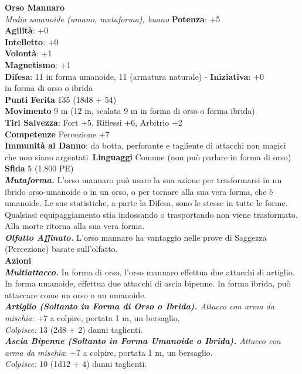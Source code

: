 \begin{multicols}{2}
\medskip\textbf{Orso Mannaro}\\
\emph{Media umanoide (umano, mutaforma), buono}
\textbf{Potenza}: +5\\
\textbf{Agilità}: +0\\
\textbf{Intelletto}: +0\\
\textbf{Volontà}: +1\\
\textbf{Magnetismo}: +1\\
\textbf{Difesa}: 11 in forma umanoide, 11 (armatura naturale) - \textbf{Iniziativa}: +0\\
in forma di orso o ibrida\\
\textbf{Punti Ferita} 135 (18d8 + 54)\\
\textbf{Movimento} 9 m (12 m, scalata 9 m in forma di orso o forma ibrida) \\
\textbf{Tiri Salvezza}:  Fort +5, Riflessi +6, Arbitrio +2\\
\textbf{Competenze} Percezione +7\\
\textbf{Immunità al Danno}: da botta, perforante e tagliente di attacchi non magici che non siano argentati\
\textbf{Linguaggi} Comune (non può parlare in forma di orso)\\
\textbf{Sfida} 5 (1.800 PE)\smallskip\\
\emph{\textbf{Mutaforma.}} L'orso mannaro può usare la sua azione per trasformarsi in un ibrido orso-umanoide o in un orso, o per tornare alla sua vera forma, che è umanoide. Le sue statistiche, a parte la Difesa, sono le stesse in tutte le forme. Qualsiasi equipaggiamento stia indossando o trasportando non viene trasformato. Alla morte ritorna alla sua vera forma.\\
\emph{\textbf{Olfatto Affinato.}} L'orso mannaro ha vantaggio nelle prove di Saggezza (Percezione) basate sull'olfatto.\\
\smallskip\textbf{Azioni}\\
\emph{\textbf{Multiattacco.}} In forma di orso, l'orso mannaro effettua due attacchi di artiglio. In forma umanoide, effettua due attacchi di ascia bipenne. In forma ibrida, può attaccare come un orso o un umanoide.\\

\emph{\textbf{Artiglio (Soltanto in Forma di Orso o Ibrida).} Attacco con arma da mischia}: +7 a colpire, portata 1 m, un bersaglio.\\
\emph{Colpisce:} 13 (2d8 + 2) danni taglienti.\\

\emph{\textbf{Ascia Bipenne (Soltanto in Forma Umanoide o Ibrida).} Attacco con arma da mischia}: +7 a colpire, portata 1 m, un bersaglio.\\
\emph{Colpisce:} 10 (1d12 + 4) danni taglienti.\\


\end{multicols}
